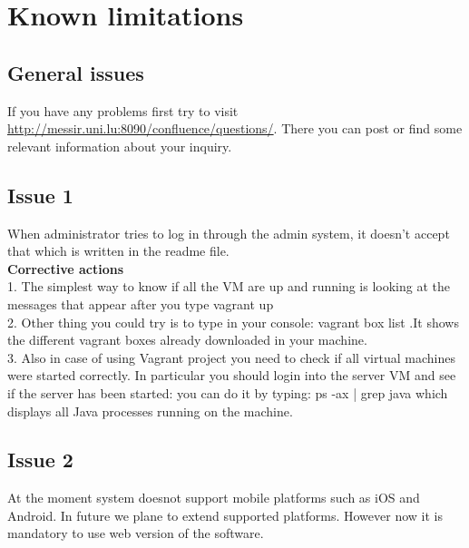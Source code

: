 \chapter{Known limitations}
\label{chap:know_limitations}


\section{General issues}
If you have any problems first try to visit
\url{http://messir.uni.lu:8090/confluence/questions/}. There you can post or
find some relevant information about your inquiry.


\section{Issue 1}
When administrator tries to log in through the admin system, it doesn't
accept that which is written in the readme file.\\

\noindent \textbf{Corrective actions}\\

1. The simplest way to know if all the VM are up and running is looking at the
messages that appear after you type vagrant up \\
2. Other thing you could try is to type in your console: vagrant box list .It
shows the different vagrant boxes already downloaded in your machine.\\
3. Also in case of using Vagrant project you need to check if all virtual
machines were started correctly. In particular you should login into the server
VM and see if the server has been started: you can do it by typing:  ps -ax |
grep java which displays all Java processes running on the machine.

\section{Issue 2}
At the moment system doesnot support mobile platforms such as iOS and Android.
In future we plane to extend supported platforms. However now it is mandatory to
use web version of the software.
